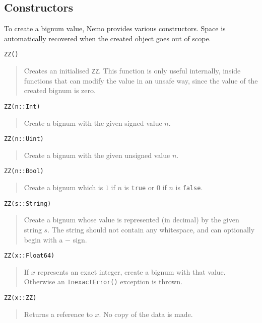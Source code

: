\documentclass[a4paper,10pt]{article}
\newcommand{\code}{\lstinline}
\newcommand{\desc}[1]{\vspace{-3mm}\begin{quote}#1\end{quote}}
\begin{document}
{{{{\subsection{Constructors}

To create a bignum value, Nemo provides various constructors. Space is automatically
recovered when the created object goes out of scope.

\begin{lstlisting}
ZZ()
\end{lstlisting}

\desc{Creates an initialised \code{ZZ}. This function is only useful internally, 
inside functions that can modify the value in an unsafe way, since the value of the
created bignum is zero.}

\begin{lstlisting}
ZZ(n::Int)
\end{lstlisting}

\desc{Create a bignum with the given signed value $n$.}

\begin{lstlisting}
ZZ(n::Uint)
\end{lstlisting}

\desc{Create a bignum with the given unsigned value $n$.}

\begin{lstlisting}
ZZ(n::Bool)
\end{lstlisting}

\desc{Create a bignum which is $1$ if $n$ is \code{true} or $0$ if $n$ is 
\code{false}.}

\begin{lstlisting}
ZZ(s::String)
\end{lstlisting}

\desc{Create a bignum whose value is represented (in decimal) by the given string
$s$. The string should not contain any whitespace, and can optionally begin with
a $-$ sign.}

\begin{lstlisting}
ZZ(x::Float64)
\end{lstlisting}

\desc{If $x$ represents an exact integer, create a bignum with that value. Otherwise
an \code{InexactError()} exception is thrown.}

\begin{lstlisting}
ZZ(x::ZZ)
\end{lstlisting}

\desc{Returns a reference to $x$. No copy of the data is made.}

}}}}
\end{document}
